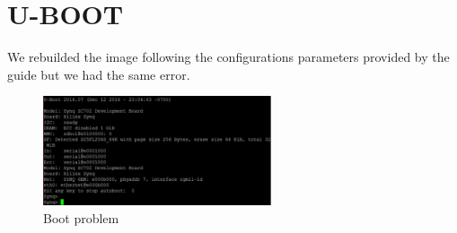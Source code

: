 \section{U-BOOT}
We rebuilded the image following the configurations parameters provided by the guide  but we had the same error.

\begin{figure}[h]
	\centering		\includegraphics[width=0.6\textwidth]{img/error4}
	\caption{Boot problem}
    	\label{fig:error4}
\end{figure}




